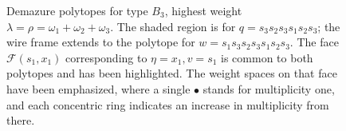 \documentclass[12pt,reqno]{amsart}
\theoremstyle{definition}
\begin{document}
\begin{figure}
\begin{center}
\caption{\label{example-figure} Demazure polytopes for type $B_3$, highest weight $\lambda = \rho = \omega_1+\omega_2+\omega_3$. The shaded region is for $q = s_3s_2s_3s_1s_2s_3$; the wire frame extends to the polytope for $w =  s_1s_3s_2s_3s_1s_2s_3$. The face $\mathcal{F}(s_1,x_1)$ corresponding to $\eta = x_1, v = s_1$ is common to both polytopes and has been highlighted. The weight spaces on that face have been emphasized, where a single $\bullet$ stands for multiplicity one, and each concentric ring indicates an increase in multiplicity from there. }
\end{center}
\end{figure}

\end{document}
